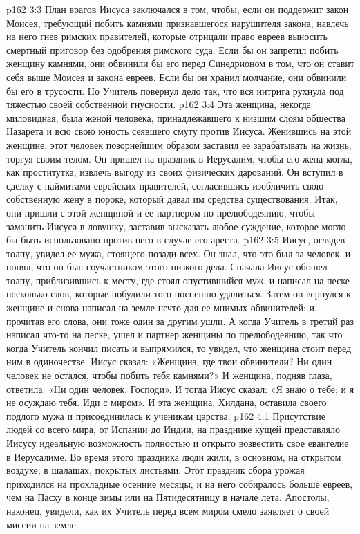 \vs p162 3:3 План врагов Иисуса заключался в том, чтобы, если он поддержит закон Моисея, требующий побить камнями признавшегося нарушителя закона, навлечь на него гнев римских правителей, которые отрицали право евреев выносить смертный приговор без одобрения римского суда. Если бы он запретил побить женщину камнями, они обвинили бы его перед Синедрионом в том, что он ставит себя выше Моисея и закона евреев. Если бы он хранил молчание, они обвинили бы его в трусости. Но Учитель повернул дело так, что вся интрига рухнула под тяжестью своей собственной гнусности.
\vs p162 3:4 Эта женщина, некогда миловидная, была женой человека, принадлежавшего к низшим слоям общества Назарета и всю свою юность сеявшего смуту против Иисуса. Женившись на этой женщине, этот человек позорнейшим образом заставил ее зарабатывать на жизнь, торгуя своим телом. Он пришел на праздник в Иерусалим, чтобы его жена могла, как проститутка, извлечь выгоду из своих физических дарований. Он вступил в сделку с наймитами еврейских правителей, согласившись изобличить свою собственную жену в пороке, который давал им средства существования. Итак, они пришли с этой женщиной и ее партнером по прелюбодеянию, чтобы заманить Иисуса в ловушку, заставив высказать любое суждение, которое могло бы быть использовано против него в случае его ареста.
\vs p162 3:5 Иисус, оглядев толпу, увидел ее мужа, стоящего позади всех. Он знал, что это был за человек, и понял, что он был соучастником этого низкого дела. Сначала Иисус обошел толпу, приблизившись к месту, где стоял опустившийся муж, и написал на песке несколько слов, которые побудили того поспешно удалиться. Затем он вернулся к женщине и снова написал на земле нечто для ее мнимых обвинителей; и, прочитав его слова, они тоже один за другим ушли. А когда Учитель в третий раз написал что\hyp{}то на песке, ушел и партнер женщины по прелюбодеянию, так что когда Учитель кончил писать и выпрямился, то увидел, что женщина стоит перед ним в одиночестве. Иисус сказал: «Женщина, где твои обвинители? Ни один человек не остался, чтобы побить тебя камнями?» И женщина, подняв глаза, ответила: «Ни один человек, Господи». И тогда Иисус сказал: «Я знаю о тебе; и я не осуждаю тебя. Иди с миром». И эта женщина, Хилдана, оставила своего подлого мужа и присоединилась к ученикам царства.
\vs p162 4:1 Присутствие людей со всего мира, от Испании до Индии, на празднике кущей представляло Иисусу идеальную возможность полностью и открыто возвестить свое евангелие в Иерусалиме. Во время этого праздника люди жили, в основном, на открытом воздухе, в шалашах, покрытых листьями. Этот праздник сбора урожая приходился на прохладные осенние месяцы, и на него собиралось больше евреев, чем на Пасху в конце зимы или на Пятидесятницу в начале лета. Апостолы, наконец, увидели, как их Учитель перед всем миром смело заявляет о своей миссии на земле.
